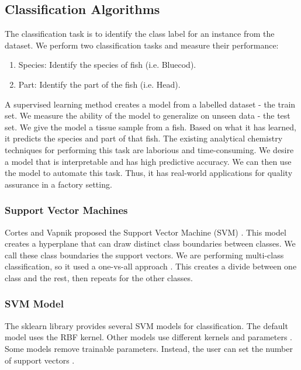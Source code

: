 \documentclass[runningheads]{llncs}
\begin{document}
\subsection{Classification Algorithms}

The classification task is to identify the class label for an instance from the dataset.
We perform two classification tasks and measure their performance:

\begin{enumerate}
  \item Species: Identify the species of fish (i.e. Bluecod).
  \item Part: Identify the part of the fish (i.e. Head).
\end{enumerate}

A supervised learning method creates a model from a labelled dataset - the train set.
We measure the ability of the model to generalize on unseen data - the test set.
We give the model a tissue sample from a fish.
Based on what it has learned, it predicts the species and part of that fish.
The existing analytical chemistry techniques for performing this task are laborious and time-consuming.
We desire a model that is interpretable and has high predictive accuracy.
We can then use the model to automate this task.
Thus, it has real-world applications for quality assurance in a factory setting.

\subsubsection{Support Vector Machines}
\label{sec:background-svm}


Cortes and Vapnik proposed the Support Vector Machine (SVM) \cite{cortes1995support}.
This model creates a hyperplane that can draw distinct class boundaries between classes.
We call these class boundaries the support vectors.
We are performing multi-class classification, so it used a one-vs-all approach \cite{sklearn2021feature}.
This creates a divide between one class and the rest, then repeats for the other classes.

\subsubsection{SVM Model}
\label{sec:background-svm-model}

The sklearn library provides several SVM models for classification.
The default model uses the RBF kernel.
Other models use different kernels and parameters \cite{sklearn2021feature}.
Some models remove trainable parameters.
Instead, the user can set the number of support vectors \cite{scholkopf2000new}.
\end{document}

